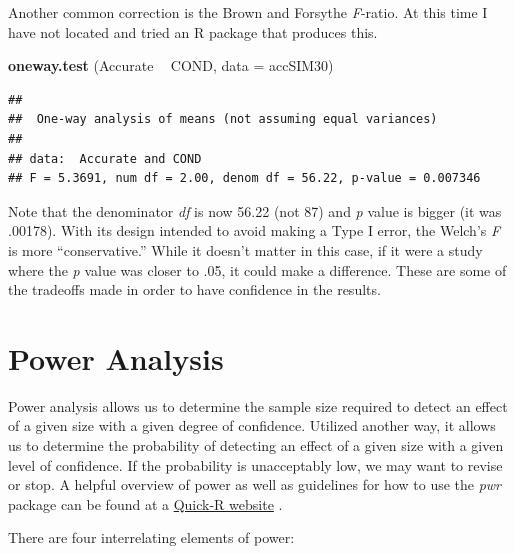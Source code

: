 \documentclass[
  english,
]{book}
\newenvironment{Shaded}{\begin{snugshade}}{\end{snugshade}}
\newcommand{\DataTypeTok}[1]{\textcolor[rgb]{0.13,0.29,0.53}{#1}}
\newcommand{\KeywordTok}[1]{\textcolor[rgb]{0.13,0.29,0.53}{\textbf{#1}}}
\newcommand{\NormalTok}[1]{#1}
\newcommand{\OperatorTok}[1]{\textcolor[rgb]{0.81,0.36,0.00}{\textbf{#1}}}
\newcommand{\StringTok}[1]{\textcolor[rgb]{0.31,0.60,0.02}{#1}}
\begin{document}
Another common correction is the Brown and Forsythe \emph{F}-ratio. At this time I have not located and tried an R package that produces this.

\begin{Shaded}
\begin{Highlighting}[]
\KeywordTok{oneway.test}\NormalTok{ (Accurate }\OperatorTok{~}\StringTok{ }\NormalTok{COND, }\DataTypeTok{data =}\NormalTok{ accSIM30)}
\end{Highlighting}
\end{Shaded}

\begin{verbatim}
## 
##  One-way analysis of means (not assuming equal variances)
## 
## data:  Accurate and COND
## F = 5.3691, num df = 2.00, denom df = 56.22, p-value = 0.007346
\end{verbatim}

Note that the denominator \emph{df} is now 56.22 (not 87) and \emph{p} value is bigger (it was .00178). With its design intended to avoid making a Type I error, the Welch's \emph{F} is more ``conservative.'' While it doesn't matter in this case, if it were a study where the \emph{p} value was closer to .05, it could make a difference. These are some of the tradeoffs made in order to have confidence in the results.

\hypertarget{power-analysis}{%
\section{Power Analysis}\label{power-analysis}}

Power analysis allows us to determine the sample size required to detect an effect of a given size with a given degree of confidence. Utilized another way, it allows us to determine the probability of detecting an effect of a given size with a given level of confidence. If the probability is unacceptably low, we may want to revise or stop. A helpful overview of power as well as guidelines for how to use the \emph{pwr} package can be found at a \href{https://www.statmethods.net/stats/power.html}{Quick-R website} \citep{kabacoff_power_2017}.

There are four interrelating elements of power:
\end{document}
